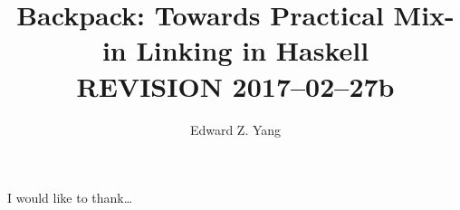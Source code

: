 \documentclass{report}
\begin{document}
\title{Backpack: Towards Practical Mix-in Linking in Haskell \\ REVISION 2017--02--27b}
\author{Edward Z. Yang}

\beforepreface%
    I would like to thank\ldots
\afterpreface%
















\end{document}
